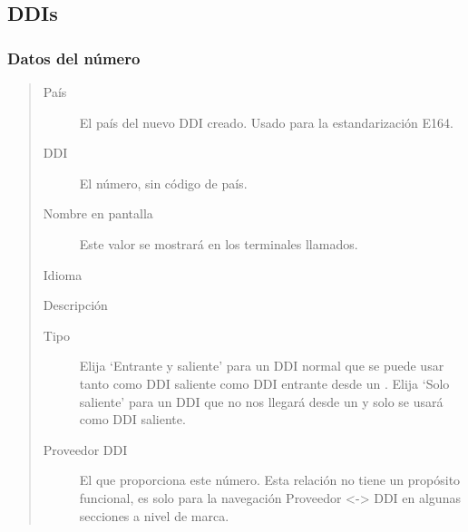 \documentclass[letterpaper,10pt,spanish]{sphinxmanual}
\begin{document}
\subsection{DDIs}
\label{administration_portal/client/vpbx/ddis:ddis}\label{administration_portal/client/vpbx/ddis::doc}\label{administration_portal/client/vpbx/ddis:pbx-ddis}

\subsubsection{Datos del número}
\label{administration_portal/client/vpbx/ddis:number-data}\begin{quote}
\begin{description}
\item[{País}] \leavevmode
El país del nuevo DDI creado. Usado para la estandarización E164.

\item[{DDI}] \leavevmode
El número, sin código de país.

\item[{Nombre en pantalla}] \leavevmode
Este valor se mostrará en los terminales llamados.

\end{description}

Idioma

Descripción
\begin{description}
\item[{Tipo}] \leavevmode
Elija `Entrante y saliente' para un DDI normal que se puede usar tanto como DDI saliente como DDI entrante desde un {\hyperref[administration_portal/brand/providers/ddi_providers:ddi\string-providers]{}}. Elija `Solo saliente' para un DDI que no nos llegará desde un {\hyperref[administration_portal/brand/providers/ddi_providers:ddi\string-providers]{}} y solo se usará como DDI saliente.

\item[{Proveedor DDI}] \leavevmode
El {\hyperref[administration_portal/brand/providers/ddi_providers:ddi\string-providers]{}} que proporciona este número. Esta relación no tiene un propósito funcional, es solo para la navegación Proveedor \textless{}-\textgreater{} DDI en algunas secciones a nivel de marca.

\end{description}
\end{quote}
\end{document}
